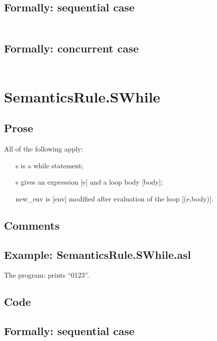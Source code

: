 \documentclass{book}
\begin{document}
  \subsection{Formally: sequential case}
  \begin{align}
  \end{align} 

  \subsection{Formally: concurrent case}
  \begin{align}
  \end{align} 

\section{SemanticsRule.SWhile \label{sec:SemanticsRule.SWhile}}

    \subsection{Prose}
    All of the following apply:
    \begin{itemize}
    \item [s] is a while statement;
    \item [s] gives an expression [e] and a loop body [body];
    \item [new\_env] is [env] modified after evaluation of the loop [(e,body)].
    \end{itemize}

    \subsection{Comments}

    \subsection{Example: SemanticsRule.SWhile.asl}
    The program:
    prints ``0123''.

  \subsection{Code}

  \subsection{Formally: sequential case}
  \begin{align}
  \end{align} 
\end{document}
